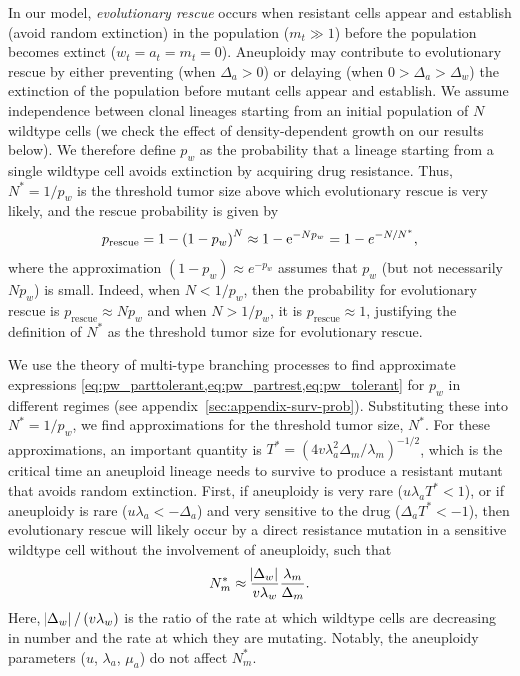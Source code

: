 \documentclass[12pt]{extarticle}
\newcommand{\e}{{\rm e}}
\newcommand{\presc}{p_\text{rescue}}
\begin{document}
In our model, \emph{evolutionary rescue} occurs when resistant cells appear and establish (avoid random extinction) in the population  ($m_t \gg 1$) before the population becomes extinct ($w_t=a_t=m_t=0$).
Aneuploidy may contribute to evolutionary rescue by either preventing (when $\Delta_a>0$) or delaying (when $0>\Delta_a>\Delta_w$) the extinction of the population before mutant cells appear and establish.
We assume independence between clonal lineages starting from an initial population of $N$ wildtype cells (we check the effect of density-dependent growth on our results below).
We therefore define $p_w$ as the probability that a lineage starting from a single wildtype cell avoids extinction by acquiring drug resistance.
Thus, $N^*=1/p_w$ is the threshold tumor size above which evolutionary rescue is very likely, and the rescue probability is given by 
\begin{equation} \label{eq:rescue_prob} 
\presc = 
1-\left(1-p_w\right)^N \approx
1-\e^{-Np_w} = 
1-e^{-N/N^*} ,
\end{equation}
where the approximation $(1-p_w)\approx e^{-p_w}$ assumes that $p_w$ (but not necessarily $N p_w$) is small.
Indeed, when $N<1/p_w$, then the probability for evolutionary rescue is $\presc \approx N p_w$  and when $N > 1/p_w$, it is $\presc \approx 1$, justifying the definition of $N^*$ as the threshold tumor size for evolutionary rescue. 

We use the theory of multi-type branching processes to find approximate expressions \cref{eq:pw_parttolerant,eq:pw_partrest,eq:pw_tolerant} for $p_w$ in different regimes (see appendix~\ref{sec:appendix-surv-prob}). 
Substituting these into $N^*=1/p_w$, we find approximations for the threshold tumor size, $N^*$. 
For these approximations, an important quantity is $T^* = (4 v \lambda_a^2 \Delta_m/\lambda_m)^{-1/2}$, which is the critical time an aneuploid lineage needs to survive to produce a resistant mutant that avoids random extinction.
First, if aneuploidy is very rare ($u\lambda_a T^*< 1$), or if aneuploidy is rare ($u\lambda_a < -\Delta_a$) and very sensitive to the drug ($\Delta_a T^* < -1$), then evolutionary rescue will likely occur by a direct resistance mutation in a sensitive wildtype cell without the involvement of aneuploidy, such that 
\begin{equation} \label{eq:N_m}
N_m^* \approx \frac{\abs{\Delta_w}}{v\lambda_w}  \frac{\lambda_m}{\Delta_m} .
\end{equation}
Here, $\abs{\Delta_w}/\left(v\lambda_w\right)$ is the ratio of the rate at which wildtype cells are decreasing in number and the rate at which they are mutating. Notably, the aneuploidy parameters ($u$, $\lambda_a$, $\mu_a$) do not affect $N_m^*$.
\end{document}

